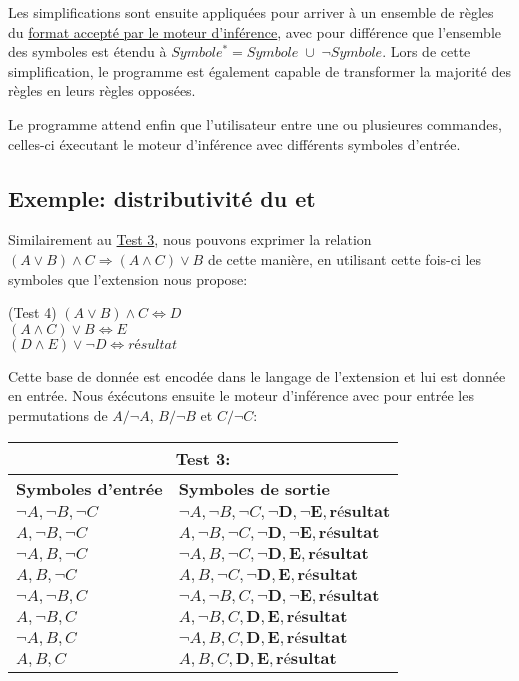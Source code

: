 \documentclass[12pt]{article}
\begin{document}
Les simplifications sont ensuite appliquées pour arriver à un ensemble de règles du \hyperref[MI]{format accepté par le moteur d'inférence}, avec pour différence que l'ensemble des symboles est étendu à $Symbole^{*} = Symbole \; \cup \; \neg Symbole$.
Lors de cette simplification, le programme est également capable de transformer la majorité des règles en leurs règles opposées.

Le programme attend enfin que l'utilisateur entre une ou plusieures commandes, celles-ci éxecutant le moteur d'inférence avec différents symboles d'entrée.

\subsection{Exemple: distributivité du \og et \fg}

Similairement au \hyperref[T3]{Test 3}, nous pouvons exprimer la relation $(A \lor B) \land C \Rightarrow (A \land C) \lor B$ de cette manière, en utilisant cette fois-ci les symboles que l'extension nous propose:

\begin{algorithm}[H]
\BeginKB(Test 4\label{T4}){
  $(A \lor B) \land C \Leftrightarrow D$ \\
  $(A \land C) \lor B \Leftrightarrow E$ \\
  $(D \land E) \lor \neg D \Leftrightarrow \textit{résultat}$
}
\end{algorithm}

Cette base de donnée est encodée dans le langage de l'extension et lui est donnée en entrée.
Nous éxécutons ensuite le moteur d'inférence avec pour entrée les permutations de $A/\neg A$, $B/\neg B$ et $C/\neg C$:

\begin{tabular}{|p{4cm}|p{6.5cm}|}
  \hline
  \multicolumn{2}{|c|}{\textbf{Test 3:}} \\
  \hline
  \textbf{Symboles d'entrée} & \textbf{Symboles de sortie} \\
  \hline
  $\neg A, \neg B, \neg C$ & $\neg A, \neg B, \neg C, \mathbf{\neg D}, \mathbf{\neg E}, \textbf{résultat}$ \\
  \hline
  $A, \neg B, \neg C$ & $A, \neg B, \neg C, \mathbf{\neg D}, \mathbf{\neg E}, \textbf{résultat}$ \\
  \hline
  $\neg A, B, \neg C$ & $\neg A, B, \neg C, \mathbf{\neg D}, \mathbf{E}, \textbf{résultat}$ \\
  \hline
  $A, B, \neg C$ & $A, B, \neg C, \mathbf{\neg D}, \mathbf{E}, \textbf{résultat}$ \\
  \hline
  $\neg A, \neg B, C$ & $\neg A, \neg B, C, \mathbf{\neg D}, \mathbf{\neg E}, \textbf{résultat}$ \\
  \hline
  $A, \neg B, C$ & $A, \neg B, C, \mathbf{D}, \mathbf{E}, \textbf{résultat}$ \\
  \hline
  $\neg A, B, C$ & $\neg A, B, C, \mathbf{D}, \mathbf{E}, \textbf{résultat}$ \\
  \hline
  $A, B, C$ & $A, B, C, \mathbf{D}, \mathbf{E}, \textbf{résultat}$ \\
  \hline
\end{tabular}
\end{document}
